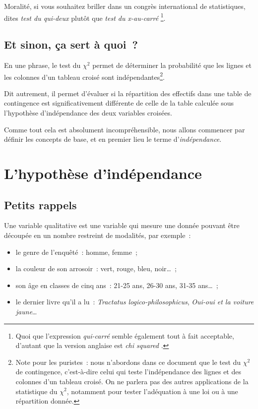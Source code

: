 \documentclass[a4paper,10pt,twoside,francais]{report}
\newcommand{\chid}{$\chi^2$\xspace}
\begin{document}
Moralité, si vous souhaitez briller dans un congrès international de
statistiques, dites \textit{\og test du qui-deux \fg{}} plutôt que
\textit{\og test du x-au-carré \fg{}}\footnote{Quoi que l'expression
  \textit{\og qui-carré \fg{}} semble également tout à fait acceptable,
  d'autant que la version anglaise est \textit{\og chi squared \fg{}}.}.

\section{Et sinon, ça sert à quoi~?}

En une phrase, le test du \chid permet de déterminer la probabilité
que les lignes et les colonnes d'un tableau croisé sont
indépendantes\footnote{Note pour les puristes~: nous n'abordons dans
  ce document que le test du \chid de contingence, c'est-à-dire celui
  qui teste l'indépendance des lignes et des colonnes d'un tableau
  croisé. On ne parlera pas des autres applications de la statistique
  du \chid, notamment pour tester l'adéquation à une loi ou à une
  répartition donnée.}.

Dit autrement, il permet d'évaluer si la répartition des effectifs
dans une table de contingence est significativement différente de
celle de la table calculée sous l'hypothèse d'indépendance des deux
variables croisées.

Comme tout cela est absolument incompréhensible, nous allons commencer
par définir les concepts de base, et en premier lieu le terme
d'\textit{indépendance}.



\chapter{L'hypothèse d'indépendance}
\label{sec-indep}

\section{Petits rappels}
\label{ssec-tabcrois}

Une variable qualitative est une variable qui mesure une donnée
pouvant être découpée en un nombre restreint de modalités, par
exemple~:

\begin{itemize}
\item le genre de l'enquêté~: homme, femme~;
\item la couleur de son arrosoir~: vert, rouge, bleu, noir\ldots~;
\item son âge en classes de cinq ans~: 21-25 ans, 26-30 ans, 31-35
  ans\ldots~;
\item le dernier livre qu'il a lu~: \textit{Tractatus logico-philosophicus},
  \textit{Oui-oui et la voiture jaune}\ldots\\
\end{itemize}
\end{document}
